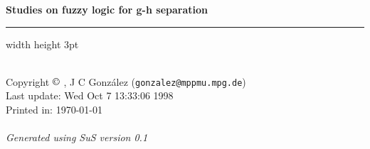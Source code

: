 \documentclass[10pt,a4paper]{article}
\def\SuS{{\it SuS\/}}%
\begin{document}
\thispagestyle{empty}
\mbox{}
\vskip 5cm
\parbox[c]{\textwidth}{
{\huge \bfseries
      Studies on fuzzy logic for g-h separation
\\}
\hrule width \textwidth height 3pt
\par
\vskip 0.5cm
\vskip 7cm
}
 
\newpage
\thispagestyle{empty}
\mbox{}
\vfill
\mbox{}\\
Copyright $\copyright$ \number\year,      J C Gonz\'alez ({\tt       gonzalez@mppmu.mpg.de})\\
Last update: Wed Oct  7 13:33:06 1998\\
Printed in: \today\\
\\
{\it Generated using \SuS{} version 0.1 \/}
\newpage
\end{document}

